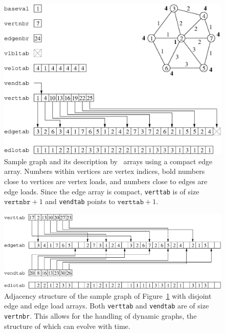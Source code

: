 \begin{figure}
\centering\includegraphics[scale=0.47]{s_f_gr1.eps}
\caption{Sample graph and its description by \libscotch\ arrays using
a compact edge array. Numbers within vertices are vertex indices, bold
numbers close to vertices are vertex loads, and numbers close to edges
are edge loads. Since the edge array is compact, {\tt verttab} is of
size $\mathtt{vertnbr} + 1$ and {\tt vendtab} points to
$\mathtt{verttab} + 1$.}
\label{fig-lib-graf-one}
\end{figure}

\begin{figure}
\centering\includegraphics[scale=0.47]{s_f_gr2.eps}
\caption{Adjacency structure of the sample graph of
Figure~\protect\ref{fig-lib-graf-one} with disjoint edge and
edge load arrays. Both {\tt verttab} and {\tt vendtab} are of
size {\tt vertnbr}. This allows for the handling of dynamic
graphs, the structure of which can evolve with time.}
\label{fig-lib-graf-two}
\end{figure}

